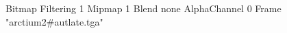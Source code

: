 {Bitmap
	{Filtering 1}
	{Mipmap 1}
	{Blend none}
	{AlphaChannel 0}
	{Frame "arctium2#autlate.tga"}
}
